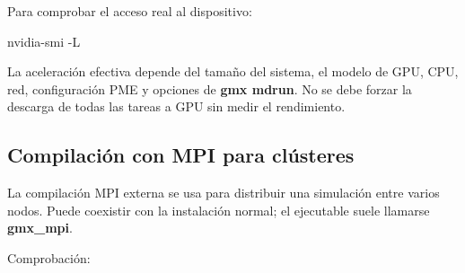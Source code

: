 \documentclass[
  spanish,
  11pt,
  a4paper]{article}
\newenvironment{Shaded}{\begin{snugshade}}{\end{snugshade}}
\newcommand{\AttributeTok}[1]{\textcolor[rgb]{0.13,0.29,0.53}{#1}}
\newcommand{\BuiltInTok}[1]{#1}
\newcommand{\ExtensionTok}[1]{#1}
\newcommand{\FunctionTok}[1]{\textcolor[rgb]{0.13,0.29,0.53}{\textbf{#1}}}
\newcommand{\NormalTok}[1]{#1}
\newcommand{\OperatorTok}[1]{\textcolor[rgb]{0.81,0.36,0.00}{\textbf{#1}}}
\newcommand{\StringTok}[1]{\textcolor[rgb]{0.31,0.60,0.02}{#1}}
\newcommand{\VariableTok}[1]{\textcolor[rgb]{0.00,0.00,0.00}{#1}}
\begin{document}
Para comprobar el acceso real al dispositivo:

\begin{Shaded}
\begin{Highlighting}[]
\ExtensionTok{nvidia{-}smi} \AttributeTok{{-}L}
\end{Highlighting}
\end{Shaded}

La aceleración efectiva depende del tamaño del sistema, el modelo de
GPU, CPU, red, configuración PME y opciones de \textbf{gmx mdrun}. No se
debe forzar la descarga de todas las tareas a GPU sin medir el
rendimiento.

\subsection{Compilación con MPI para
clústeres}\label{compilaciuxf3n-con-mpi-para-cluxfasteres}

La compilación MPI externa se usa para distribuir una simulación entre
varios nodos. Puede coexistir con la instalación normal; el ejecutable
suele llamarse \textbf{gmx\_mpi}.

\begin{Shaded}
\end{Shaded}

Comprobación:

\begin{Shaded}
\end{Shaded}
\end{document}
